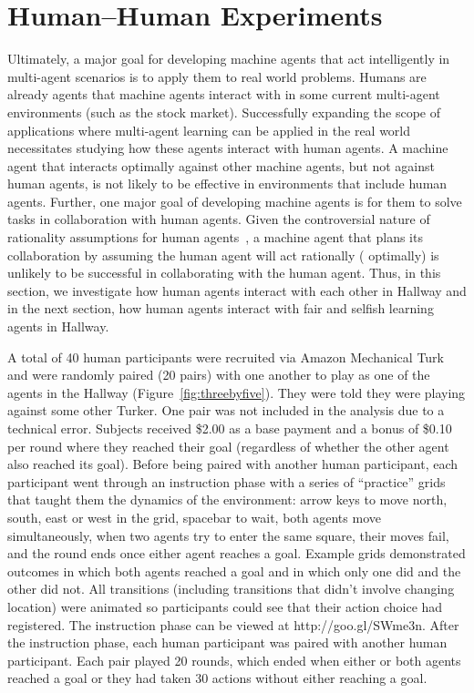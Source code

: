 \documentclass[letterpaper]{article}
\begin{document}
\section{Human--Human Experiments}

Ultimately, a major goal for developing machine agents that act
intelligently in multi-agent scenarios is to apply them to real world
problems. Humans are already agents that machine agents interact with
in some current multi-agent environments (such as the stock
market). Successfully expanding the scope of applications where
multi-agent learning can be applied in the real world necessitates
studying how these agents interact with human agents. A machine agent
that interacts optimally against other machine agents, but not against
human agents, is not likely to be effective in environments that
include human agents. Further, one major goal of developing machine
agents is for them to solve tasks in collaboration with human
agents. Given the controversial nature of rationality assumptions for
human agents~\cite{kahnemanst82}, a machine agent that plans its
collaboration by assuming the human agent will act rationally (
optimally) is unlikely to be successful in collaborating with the
human agent. Thus, in this section, we investigate how human agents
interact with each other in Hallway and in the next section, how human agents interact with fair and selfish learning agents in Hallway.

A total of 40 human participants were recruited via Amazon Mechanical
Turk and were randomly paired (20 pairs) with one another to play as
one of the agents in the Hallway (Figure~\ref{fig:threebyfive}). They
were told they were playing against some other Turker. One pair was
not included in the analysis due to a technical error. Subjects
received \$2.00 as a base payment and a bonus of \$0.10 per round
where they reached their goal (regardless of whether the other agent
also reached its goal). Before being paired with another human
participant, each participant went through an instruction phase with a
series of ``practice'' grids that taught them the dynamics of the
environment: arrow keys to move north, south, east or west in the
grid, spacebar to wait, both agents move simultaneously, when two
agents try to enter the same square, their moves fail, and the round
ends once either agent reaches a goal.  Example grids demonstrated
outcomes in which both agents reached a goal and in which only one did
and the other did not. All transitions (including transitions that
didn't involve changing location) were animated so participants could
see that their action choice had registered.
The instruction phase can be viewed at http://goo.gl/SWme3n. After
the instruction phase, each human participant was paired with another
human participant. Each pair played 20 rounds, which ended when either
or both agents reached a goal or they had taken 30 actions
without either reaching a goal.
\end{document}
